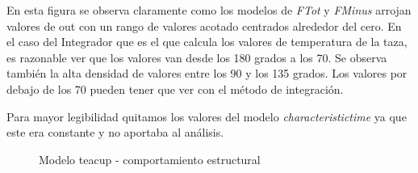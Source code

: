 En esta figura se observa claramente como los modelos de \textit{FTot} y \textit{FMinus} 
arrojan valores de out con un rango de valores acotado centrados alrededor del cero. 
En el caso del Integrador que es el que calcula los valores de temperatura de la taza, 
es razonable ver que los valores van desde los 180 grados a los 70. Se observa también 
la alta densidad de valores entre los 90 y los 135 grados. Los valores por debajo de los 
70 pueden tener que ver con el método de integración. 

Para mayor legibilidad quitamos los valores del modelo \textit{characteristictime} 
ya que este era constante y no aportaba al análisis.

\begin{figure}[H]
    \centering     %
        \caption{Modelo teacup - comportamiento estructural}
\end{figure}


